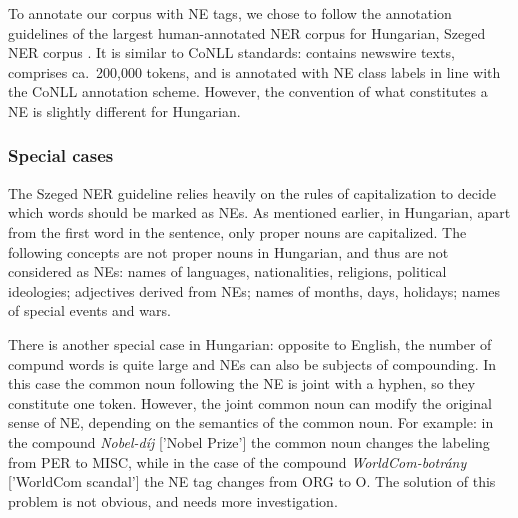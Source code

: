 \documentclass[11pt]{article}
\begin{document}
To annotate our corpus with NE tags, we chose to follow the annotation guidelines of the largest human-annotated NER corpus for Hungarian, Szeged NER corpus \cite{Szarvas:06}. It is similar to CoNLL standards: contains newswire texts, comprises ca.~200,000 tokens, and is annotated with NE class labels in line with the CoNLL annotation scheme. However, the convention of what constitutes a NE is slightly different for Hungarian. 

\subsubsection{Special cases}

The Szeged NER guideline relies heavily on the rules of capitalization to decide which words should be marked as NEs. As mentioned earlier, in Hungarian, apart from the first word in the sentence, only proper nouns are capitalized. The following concepts are not proper nouns in Hungarian, and thus are not considered as NEs: names of languages, nationalities, religions, political ideologies; adjectives derived from NEs; names of months, days, holidays; names of special events and wars.


There is another special case in Hungarian: opposite to English, the number of compund words is quite large and NEs can also be subjects of compounding. In this case the common noun following the NE is joint with a hyphen, so they constitute one token. However, the joint common noun can modify the original sense of NE, depending on the semantics of the common noun. For example: in the compound \textit{Nobel-díj} ['Nobel Prize'] the common noun changes the labeling from PER to MISC, while 
in the case of the compound \textit{WorldCom-botrány} ['WorldCom scandal'] the NE tag changes from ORG to O. The solution of this problem is not obvious, and needs more investigation.

\end{document}
